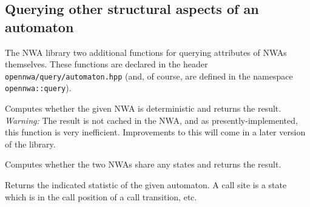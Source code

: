 




\subsection{Querying other structural aspects of an automaton}
\label{Se:query-automaton}

The NWA library two additional functions for querying attributes
of NWAs themselves. 
These functions are declared in the header
\texttt{opennwa/query/automaton.hpp} (and, of course, are defined in the
namespace \texttt{opennwa::query}).

\begin{functionlist}
    Computes whether the given NWA is deterministic and returns the
    result. \textit{Warning:} The result is not cached in the NWA, and
    as presently-implemented, this function is very
    inefficient. Improvements to this will come in a later version of
    the library.

    Computes whether the two NWAs share any states and returns the
    result.

    Returns the indicated statistic of the given automaton. A call site is a
    state which is in the call position of a call transition, etc.
\end{functionlist}


